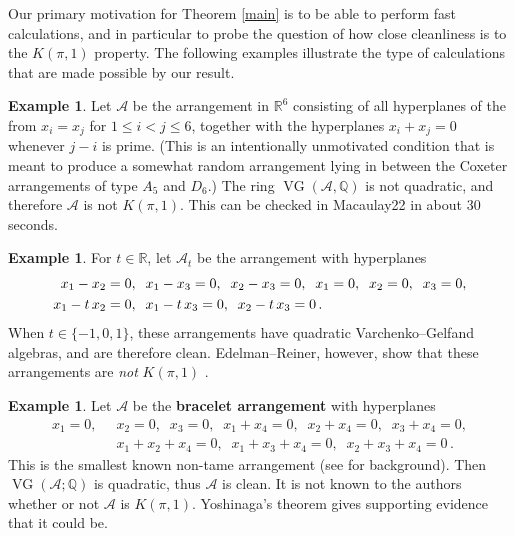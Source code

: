 \documentclass[11pt]{article}
\theoremstyle{definition}
\newtheorem{example}[theorem]{Example}
\newcommand{\Q}{{\mathbb{Q}}}
\newcommand{\<}{\left<}
\renewcommand{\>}{\right>}
\newcommand{\cA}{\mathcal{A}}
\newcommand{\VG}{\operatorname{VG}}
\begin{document}
Our primary motivation for Theorem \ref{main} is to be able to perform fast calculations, 
and in particular to probe the question of how close cleanliness is to the $K(\pi,1)$ property. 
The following examples illustrate the type of calculations that are made possible by our result.

\begin{example}
Let $\cA$ be the arrangement in $\mathbb{R}^6$ consisting of all hyperplanes of the from $x_i = x_j$ for $1\leq i<j\leq 6$, 
together with the hyperplanes $x_i + x_j = 0$ whenever $j - i$ is prime.
(This is an intentionally unmotivated condition that is meant to produce a somewhat random arrangement lying in between
the Coxeter arrangements of type $A_5$ and $D_6$.)
The ring $\VG(\cA,\Q)$ is not quadratic, and therefore $\cA$ is not $K(\pi,1)$.
This can be checked in Macaulay22 in about 30 seconds.
\end{example}

\begin{example}
  For $t\in\mathbb{R}$, let $\cA_t$ be the arrangement with hyperplanes
  \begin{align*}
  x_1 - x_2 & = 0,\;\; x_1 - x_3 = 0,\;\; x_2 - x_3 = 0,\;\; x_1 = 0,\;\; x_2 = 0,\;\; x_3 = 0, \\ x_1 - t\thinspace x_2 & = 0,\;\; x_1 - t \thinspace x_3 = 0,\;\; x_2 - t \thinspace x_3 = 0\,.
  \end{align*}
When $t\in\{-1,0,1\}$, these arrangements have quadratic Varchenko--Gelfand algebras, and are therefore clean.
Edelman--Reiner, however, show that these arrangements are \emph{not} $K(\pi,1)$ \cite[Theorem 2.1]{Edelman-Reiner3}.
\end{example}

\begin{example}
  Let $\cA$ be the {\bf bracelet arrangement} with hyperplanes
  \begin{align*}
  x_1 = 0,\;\; & x_2 = 0,\;\; x_3 = 0,\;\; x_1+x_4 = 0,\;\; x_2+x_4 = 0,\;\; x_3+x_4 = 0, \\ & x_1+x_2+x_4 = 0,\;\; x_1+x_3+x_4 = 0,\;\; x_2+x_3+x_4 = 0\,.
  \end{align*}
  This is the smallest known non-tame arrangement (see \cite{Ab25} for
  background).
Then $\VG(\cA;\Q)$ is quadratic, thus $\cA$ is clean.  
It is not known to the authors whether or not $\cA$ is $K(\pi,1)$.
Yoshinaga's theorem gives supporting evidence that it could be.
\end{example}
\end{document}
